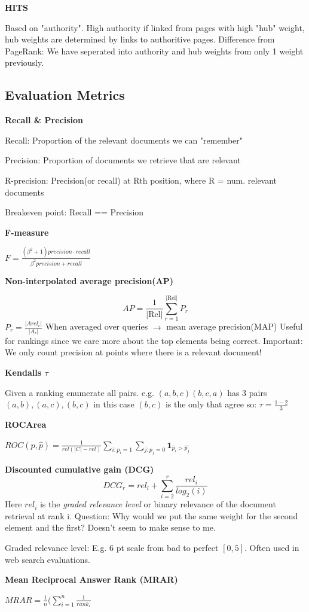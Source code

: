 \documentclass[a4paper,10pt,landscape]{article}
\newcommand{\topic}[1]{\begin{center}\section*{#1}\end{center}}
\begin{document}
\begin{multicols}{3}
\textbf{HITS}

Based on "authority".
High authority if linked from pages with high "hub" weight, hub weights are determined by links to authoritive pages.
Difference from PageRank: We have seperated into authority and hub weights from only 1 weight previously.

\topic{Evaluation Metrics}

\textbf{Recall & Precision}

Recall: Proportion of the relevant documents we can "remember"

Precision: Proportion of documents we retrieve that are relevant

R-precision: Precision(or recall) at Rth position, where R = num. relevant documents

Breakeven point: Recall == Precision

\textbf{F-measure}

$F = \frac{(\beta^2+1)precision \cdot recall}{\beta^2precision + recall}$

\textbf{Non-interpolated average precision(AP)}

$$AP = \frac{1}{|\text{Rel}|}\sum_{r=1}^{|\text{Rel}|}P_r$$
$P_r=\frac{|Arel_r|}{|A_r|}$
When averaged over queries $\xrightarrow{}$ mean average precision(MAP)
Useful for rankings since we care more about the top elements being correct.
Important: We only count precision at points where there is a relevant document!

\textbf{Kendalls $\tau$}

Given a ranking enumerate all pairs. e.g.
$(a,b,c) (b,c,a)$ has 3 pairs $(a,b),(a,c),(b,c)$ in this case $(b,c)$ is the only that agree so: $\tau = \frac{1-2}{3}$ 

\textbf{ROCArea}

$ROC(p,\hat{p}) = \frac{1}{rel(|C|-rel)}\sum_{i:p_i=1}\sum_{j:p_j=0}\textbf{1}_{\hat{p}_i>\hat{p_j}}$

\textbf{Discounted cumulative gain (DCG)}
$$DCG_r = rel_l + \sum_{i=2}^{r}\frac{rel_i}{log_2(i)}$$
Here $rel_i$ is the \textit{graded relevance level} or binary relevance of the document retrieval at rank i.
Question: Why would we put the same weight for the second element and the first? Doesn't seem to make sense to me.

Graded relevance level:
E.g. 6 pt scale from bad to perfect $[0,5]$.
Often used in web search evaluations.

\textbf{Mean Reciprocal Answer Rank (MRAR)}

$MRAR = \frac{1}{n}(\sum_{i=1}^{n}\frac{1}{rank_i}$


\end{multicols}
\end{document}
